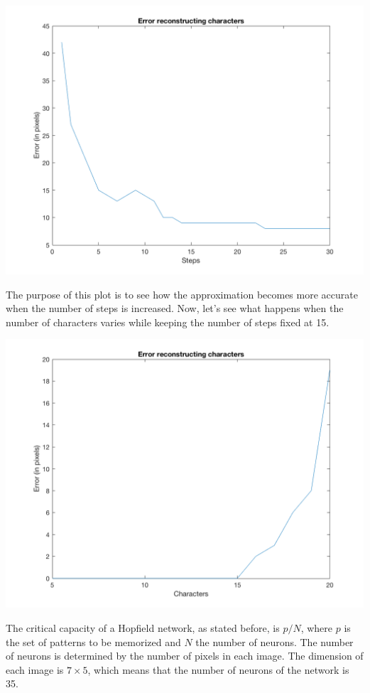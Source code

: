 \documentclass[10pt]{article}
\begin{document}
\begin{multicols}{2}
  \begin{center}
    \includegraphics[width=\linewidth]{img/plot_error1}
  \end{center}

  The purpose of this plot is to see how the approximation becomes more
  accurate when the number of steps is increased. Now, let's see what
  happens when the number of characters varies while keeping the number
  of steps fixed at 15.

  \begin{center}
    \includegraphics[width=\linewidth]{img/plot_error2}
  \end{center}

  The critical capacity of a Hopfield network, as stated before, is $p/N$,
  where $p$ is the set of patterns to be memorized and $N$ the number
  of neurons. The number of neurons is determined by the number of pixels
  in each image. The dimension of each image is $7 \times 5$, which means that
  the number of neurons of the network is 35.


\end{multicols}
\end{document}
